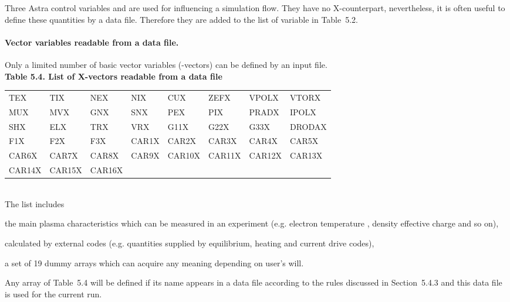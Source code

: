 Three Astra control variables  and  are used
for influencing a simulation flow. 
They have no X-counterpart, nevertheless, it is often useful to define
these quantities by a data file. 
Therefore they are added to the list of variable in Table~5.2.

\paragraph{Vector variables readable from a data file.}
Only a limited number of basic vector variables (-vectors) can be
defined by an input file. 
\medskip\\
\indent
{\bf Table 5.4. List of X-vectors readable from a data file}
\nopagebreak
\medskip\\
\nopagebreak
\noindent
{\tt\begin{tabular}
{|p{15mm}p{15mm}p{15mm}p{15mm}p{15mm}p{15mm}p{15mm}p{15mm}|}
\hline
TEX	&TIX	&NEX	&NIX	&CUX	&ZEFX	&VPOLX	&VTORX 	\\
MUX	&MVX	&GNX	&SNX	&PEX	&PIX	&PRADX	&IPOLX	\\
SHX	&ELX	&TRX	&VRX	&G11X	&G22X	&G33X	&DRODAX	\\
F1X	&F2X	&F3X	&CAR1X	&CAR2X	&CAR3X	&CAR4X	&CAR5X	\\
CAR6X	&CAR7X	&CAR8X	&CAR9X	&CAR10X	&CAR11X	&CAR12X	&CAR13X	\\
CAR14X	&CAR15X	&CAR16X	&	&	&	&	&	\\
\hline
\end{tabular}
}\bigskip\\
The list includes 
\begin{description}
\vspace*{-1ex}\item[--] 
the main plasma characteristics which can be measured in an experiment 
(e.g. electron temperature , density  effective 
charge  and so on), 
\vspace*{-1ex}\item[--]
calculated by external codes (e.g. quantities supplied by 
equilibrium, heating and current drive codes), 
\vspace*{-1ex}\item[--] 
a set of 19 dummy arrays  
which can acquire any meaning depending on user's will. 
\end{description}\vspace*{-1ex}
Any array of Table~5.4 will be defined if its name appears in a data
file according to the rules discussed in Section~5.4.3 and this data
file is used for the current run.


